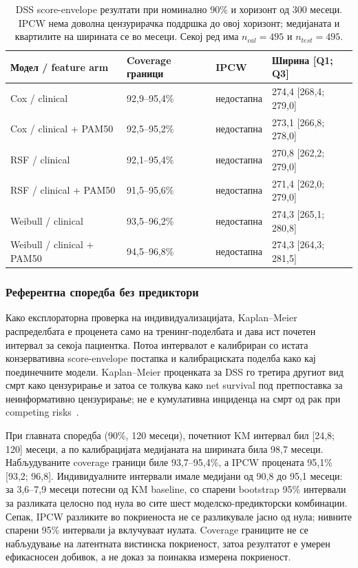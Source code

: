 \documentclass[12pt]{article}
\begin{document}
\begin{table}[ht]
\centering
\caption{DSS score-envelope резултати при номинално 90\% и хоризонт од 300 месеци. IPCW нема доволна цензурирачка поддршка до овој хоризонт; медијаната и квартилите на ширината се во месеци. Секој ред има $n_{cal}=495$ и $n_{test}=495$.}
\label{tab:dss-conformal-90-300}
\footnotesize
\setlength{\tabcolsep}{3pt}
\begin{tabular}{p{}p{}p{}p{}}
\hline
Модел / feature arm & Coverage граници & IPCW & Ширина [Q1; Q3] \\
\hline
Cox / clinical & 92,9--95,4\% & недостапна & 274,4 [268,4; 279,0] \\
Cox / clinical + PAM50 & 92,5--95,2\% & недостапна & 273,1 [266,8; 278,0] \\
RSF / clinical & 92,1--95,4\% & недостапна & 270,8 [262,2; 279,0] \\
RSF / clinical + PAM50 & 91,5--95,6\% & недостапна & 271,4 [262,0; 279,0] \\
Weibull / clinical & 93,5--96,2\% & недостапна & 274,3 [265,1; 280,8] \\
Weibull / clinical + PAM50 & 94,5--96,8\% & недостапна & 274,3 [264,3; 281,5] \\
\hline
\end{tabular}
\end{table}
\subsubsection{Референтна споредба без предиктори}

Како експлораторна проверка на индивидуализацијата, Kaplan--Meier распределбата
е проценета само на тренинг-поделбата и дава ист почетен интервал за секоја
пациентка. Потоа интервалот е калибриран со истата конзервативна score-envelope
постапка и калибрациската поделба како кај поединечните модели. Kaplan--Meier
проценката за DSS го третира другиот вид смрт како цензурирање и затоа се
толкува како net survival под претпоставка за неинформативно цензурирање; не е
кумулативна инциденца на смрт од рак при competing risks~\cite{kaplan1958,putter2007}.

При главната споредба (90\%, 120 месеци), почетниот KM интервал бил
[24,8; 120] месеци, а по калибрацијата медијаната на ширината била 98,7 месеци.
Набљудуваните coverage граници биле 93,7--95,4\%, а IPCW процената 95,1\%
[93,2; 96,8]. Индивидуалните интервали имале медијани од 90,8 до 95,1 месеци:
за 3,6--7,9 месеци потесни од KM baseline, со спарени bootstrap 95\% интервали
за разликата целосно под нула во сите шест моделско-предикторски комбинации.
Сепак, IPCW разликите во покриеноста не се разликувале јасно од нула; нивните
спарени 95\% интервали ја вклучуваат нулата. Coverage границите не се
набљудување на латентната вистинска покриеност, затоа резултатот е умерен
ефикасносен добивок, а не доказ за поинаква измерена покриеност.
\end{document}
